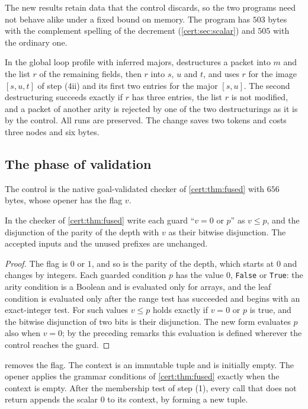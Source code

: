 The new results retain data that the control discards, so the two programs
need not behave alike under a fixed bound on memory. The program has $503$
bytes with the complement spelling of the decrement (\cref{cert:sec:scalar})
and $505$ with the ordinary one.

In the global loop profile with inferred majors, 
destructures a packet into $m$ and the list $r$ of the remaining fields, then
$r$ into $s$, $u$ and $t$, and uses $r$ for the image $[s,u,t]$ of step (4ii)
and its first two entries for the major $[s,u]$. The second destructuring
succeeds exactly if $r$ has three entries, the list $r$ is not modified, and a
packet of another arity is rejected by one of the two destructurings as it is
by the control. All runs are preserved. The change saves two tokens and costs
three nodes and six bytes.

\subsection{The phase of validation}

The control is the native goal-validated checker of \cref{cert:thm:fused} with
$656$ bytes, whose opener has the flag $v$.

\begin{proposition}\label{cert:prop:order}
In the checker of \cref{cert:thm:fused} write each guard ``$v=0$ or $p$'' as
$v\le p$, and the disjunction of the parity of the depth with $v$ as their
bitwise disjunction. The accepted inputs and the unused prefixes are
unchanged.
\end{proposition}
\begin{proof}
The flag is $0$ or $1$, and so is the parity of the depth, which starts at $0$
and changes by integers. Each guarded condition $p$ has the value $0$,
\texttt{False} or \texttt{True}: the arity condition is a Boolean and is
evaluated only for arrays, and the leaf condition is evaluated only after the
range test has succeeded and begins with an exact-integer test. For such
values $v\le p$ holds exactly if $v=0$ or $p$ is true, and the bitwise
disjunction of two bits is their disjunction. The new form evaluates $p$ also
when $v=0$; by the preceding remarks this evaluation is defined wherever the
control reaches the guard.
\end{proof}

 removes the flag. The context is an immutable tuple and
is initially empty. The opener applies the grammar conditions of
\cref{cert:thm:fused} exactly when the context is empty. After the membership
test of step (1), every call that does not return appends the scalar $0$ to
its context, by forming a new tuple.

